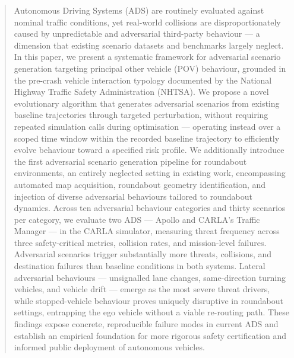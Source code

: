 \documentclass[sigconf,review,anonymous]{acmart}
\begin{document}
\begin{abstract}
Autonomous Driving Systems (ADS) are routinely evaluated against nominal traffic conditions, yet real-world collisions are disproportionately caused by unpredictable and adversarial third-party behaviour — a dimension that existing scenario datasets and benchmarks largely neglect. In this paper, we present a systematic framework for adversarial scenario generation targeting principal other vehicle (POV) behaviour, grounded in the pre-crash vehicle interaction typology documented by the National Highway Traffic Safety Administration (NHTSA). We propose a novel evolutionary algorithm that generates adversarial scenarios from existing baseline trajectories through targeted perturbation, without requiring repeated simulation calls during optimisation — operating instead over a scoped time window within the recorded baseline trajectory to efficiently evolve behaviour toward a specified risk profile. We additionally introduce the first adversarial scenario generation pipeline for roundabout environments, an entirely neglected setting in existing work, encompassing automated map acquisition, roundabout geometry identification, and injection of diverse adversarial behaviours tailored to roundabout dynamics. Across ten adversarial behaviour categories and thirty scenarios per category, we evaluate two ADS — Apollo and CARLA's Traffic Manager — in the CARLA simulator, measuring threat frequency across three safety-critical metrics, collision rates, and mission-level failures. Adversarial scenarios trigger substantially more threats, collisions, and destination failures than baseline conditions in both systems. Lateral adversarial behaviours — unsignalled lane changes, same-direction turning vehicles, and vehicle drift — emerge as the most severe threat drivers, while stopped-vehicle behaviour proves uniquely disruptive in roundabout settings, entrapping the ego vehicle without a viable re-routing path. These findings expose concrete, reproducible failure modes in current ADS and establish an empirical foundation for more rigorous safety certification and informed public deployment of autonomous vehicles.
\end{abstract}


\maketitle
\end{document}
